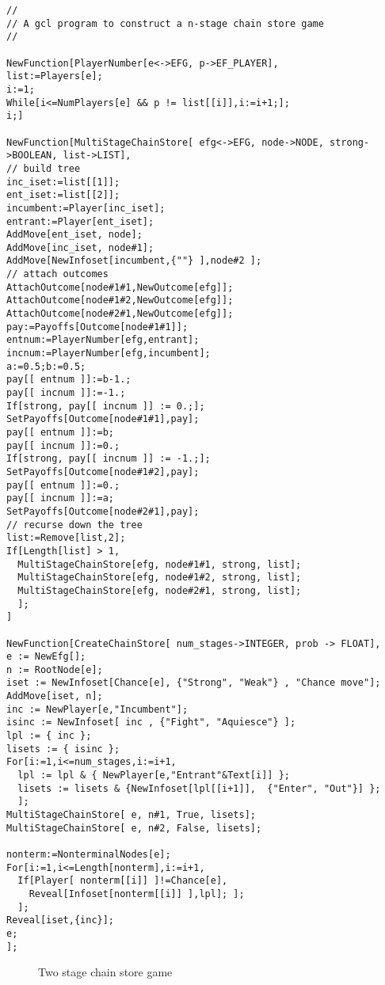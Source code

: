 \begin{verbatim}
//
// A gcl program to construct a n-stage chain store game
//

NewFunction[PlayerNumber[e<->EFG, p->EF_PLAYER],
list:=Players[e];
i:=1;
While[i<=NumPlayers[e] && p != list[[i]],i:=i+1;];
i;]

NewFunction[MultiStageChainStore[ efg<->EFG, node->NODE, strong->BOOLEAN, list->LIST],
// build tree
inc_iset:=list[[1]];
ent_iset:=list[[2]];
incumbent:=Player[inc_iset];
entrant:=Player[ent_iset];
AddMove[ent_iset, node];
AddMove[inc_iset, node#1];
AddMove[NewInfoset[incumbent,{""} ],node#2 ];
// attach outcomes 
AttachOutcome[node#1#1,NewOutcome[efg]];
AttachOutcome[node#1#2,NewOutcome[efg]];
AttachOutcome[node#2#1,NewOutcome[efg]];
pay:=Payoffs[Outcome[node#1#1]];
entnum:=PlayerNumber[efg,entrant];
incnum:=PlayerNumber[efg,incumbent];
a:=0.5;b:=0.5;
pay[[ entnum ]]:=b-1.;
pay[[ incnum ]]:=-1.;
If[strong, pay[[ incnum ]] := 0.;];
SetPayoffs[Outcome[node#1#1],pay];
pay[[ entnum ]]:=b;
pay[[ incnum ]]:=0.;
If[strong, pay[[ incnum ]] := -1.;];
SetPayoffs[Outcome[node#1#2],pay];
pay[[ entnum ]]:=0.;
pay[[ incnum ]]:=a;
SetPayoffs[Outcome[node#2#1],pay];
// recurse down the tree
list:=Remove[list,2];
If[Length[list] > 1,
  MultiStageChainStore[efg, node#1#1, strong, list];
  MultiStageChainStore[efg, node#1#2, strong, list];
  MultiStageChainStore[efg, node#2#1, strong, list];
  ];
]

NewFunction[CreateChainStore[ num_stages->INTEGER, prob -> FLOAT],
e := NewEfg[];
n := RootNode[e];
iset := NewInfoset[Chance[e], {"Strong", "Weak"} , "Chance move"];
AddMove[iset, n];
inc := NewPlayer[e,"Incumbent"];
isinc := NewInfoset[ inc , {"Fight", "Aquiesce"} ];
lpl := { inc };
lisets := { isinc }; 
For[i:=1,i<=num_stages,i:=i+1,
  lpl := lpl & { NewPlayer[e,"Entrant"&Text[i]] };
  lisets := lisets & {NewInfoset[lpl[[i+1]],  {"Enter", "Out"}] };
  ];
MultiStageChainStore[ e, n#1, True, lisets];
MultiStageChainStore[ e, n#2, False, lisets];

nonterm:=NonterminalNodes[e];
For[i:=1,i<=Length[nonterm],i:=i+1,
  If[Player[ nonterm[[i]] ]!=Chance[e],
    Reveal[Infoset[nonterm[[i]] ],lpl]; ];
  ];	
Reveal[iset,{inc}];
e;
];

\end{verbatim}

\newpage
\begin{figure}[h]
\centerline{}
\caption{Two stage chain store game}
\end{figure}

